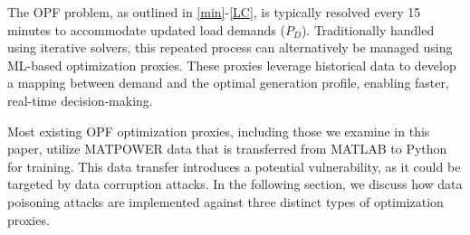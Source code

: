 The OPF problem, as outlined in \eqref{min}-\eqref{LC}, is typically resolved every 15 minutes to accommodate updated load demands ($P_D$). Traditionally handled using iterative solvers, this repeated process can alternatively be managed using ML-based optimization proxies. These proxies leverage historical data to develop a mapping between demand and the optimal generation profile, enabling faster, real-time decision-making.

Most existing OPF optimization proxies, including those we examine in this paper, utilize MATPOWER data that is transferred from MATLAB to Python for training. This data transfer introduces a potential vulnerability, as it could be targeted by data corruption attacks. In the following section, we discuss how data poisoning attacks are implemented against three distinct types of optimization proxies.